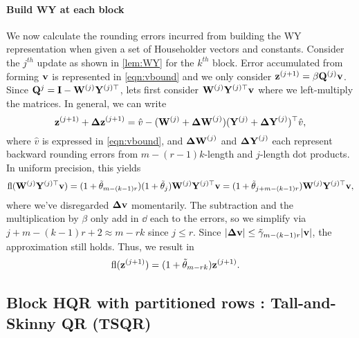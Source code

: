 \paragraph{Build WY at each block}
We now calculate the rounding errors incurred from building the WY representation when given a set of Householder vectors and constants. 
Consider the $j^{th}$ update as shown in \cref{lem:WY} for the $k^{th}$ block.
Error accumulated from forming $\mathbf{v}$ is represented in \cref{eqn:vbound} and we only consider $\mathbf{z}^{(j+1)} =\beta\mathbf{Q}^{(j)}\mathbf{v}$. 
Since $\mathbf{Q}^{j} = \mathbf{I} - \mathbf{W}^{(j)}\mathbf{Y}^{(j)\top}$, lets first consider $\mathbf{W}^{(j)}\mathbf{Y}^{(j)\top}\mathbf{v}$ where we left-multiply the matrices.
In general, we can write
\begin{equation*}
\mathbf{z}^{(j+1)} + \mathbf{\Delta z}^{(j+1)} = \hat{v} - (\mathbf{W}^{(j)} + \mathbf{\Delta W}^{(j)})(\mathbf{Y}^{(j)}+\mathbf{\Delta Y}^{(j)})^{\top}\hat{v}, 
\end{equation*}
where $\hat{v}$ is expressed in \cref{eqn:vbound}, and $\mathbf{\Delta W}^{(j)}$ and $\mathbf{\Delta Y}^{(j)}$ each represent backward rounding errors from $m-(r-1)k$-length and $j$-length dot products.
In uniform precision, this yields
\begin{equation*}
	\mathrm{fl}(\mathbf{W}^{(j)}\mathbf{Y}^{(j)\top}\mathbf{v})= (1+\tilde{\theta}_{m-(k-1)r})(1+\tilde{\theta}_{j})\mathbf{W}^{(j)}\mathbf{Y}^{(j)\top}\mathbf{v} = (1+\tilde{\theta}_{j+m-(k-1)r})\mathbf{W}^{(j)}\mathbf{Y}^{(j)\top}\mathbf{v},
\end{equation*}
where we've disregarded $\mathbf{\Delta v}$ momentarily.
The subtraction and the multiplication by $\beta$ only add in $\dd$ each to the errors, so we simplify via $j+m-(k-1)r+2 \approx m-rk$ since $j\leq r$.
Since $|\mathbf{\Delta v}| \leq \tilde{\gamma}_{m-(k-1)r}|\mathbf{v}|$, the approximation still holds.
Thus, we result in
\begin{align*}
	\mathrm{fl}(\mathbf{z}^{(j+1)}) &= (1+\tilde{\theta}_{m-rk})\mathbf{z}^{(j+1)}.
\end{align*}

\subsection{Block HQR with partitioned rows : Tall-and-Skinny QR (TSQR)}\label{sec:TSQR}